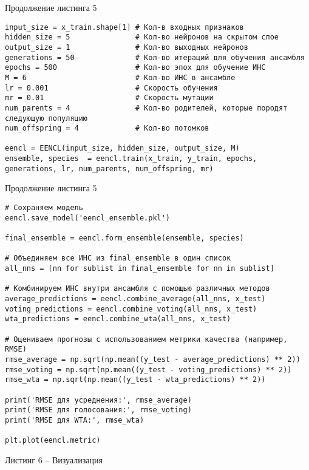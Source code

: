 \documentclass[12pt]{extarticle}
\begin{document}
\newpage

Продолжение листинга 5

\begin{lstlisting}
input_size = x_train.shape[1] # Кол-в входных признаков
hidden_size = 5               # Кол-во нейронов на скрытом слое
output_size = 1               # Кол-во выходных нейронов
generations = 50              # Кол-во итераций для обучения ансамбля
epochs = 500                  # Кол-во эпох для обучение ИНС
M = 6                         # Кол-во ИНС в ансамбле
lr = 0.001                    # Скорость обучения
mr = 0.01                     # Скорость мутации
num_parents = 4               # Кол-во родителей, которые породят следующую популяцию
num_offspring = 4             # Кол-во потомков

eencl = EENCL(input_size, hidden_size, output_size, M)
ensemble, species  = eencl.train(x_train, y_train, epochs, generations, lr, num_parents, num_offspring, mr)

\end{lstlisting}

\newpage

Продолжение листинга 5

\begin{lstlisting}
# Сохраняем модель
eencl.save_model('eencl_ensemble.pkl')

final_ensemble = eencl.form_ensemble(ensemble, species)

# Объединяем все ИНС из final_ensemble в один список
all_nns = [nn for sublist in final_ensemble for nn in sublist]

# Комбинируем ИНС внутри ансамбля с помощью различных методов
average_predictions = eencl.combine_average(all_nns, x_test)
voting_predictions = eencl.combine_voting(all_nns, x_test)
wta_predictions = eencl.combine_wta(all_nns, x_test)

# Оцениваем прогнозы с использованием метрики качества (например, RMSE)
rmse_average = np.sqrt(np.mean((y_test - average_predictions) ** 2))
rmse_voting = np.sqrt(np.mean((y_test - voting_predictions) ** 2))
rmse_wta = np.sqrt(np.mean((y_test - wta_predictions) ** 2))

print('RMSE для усреднения:', rmse_average)
print('RMSE для голосования:', rmse_voting)
print('RMSE для WTA:', rmse_wta)

plt.plot(eencl.metric)
\end{lstlisting}

\newpage

Листинг 6 -- Визуализация
            
\end{document}
